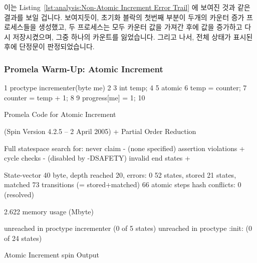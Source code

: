 이는
Listing~\ref{lst:analysis:Non-Atomic Increment Error Trail}
에 보여진 것과 같은 결과를 보일 겁니다.
보여지듯이, 초기화 블락의 첫번째 부분이 두개의 카운터 증가 프로세스들을
생성했고, 두 프로세스는 모두 카운터 값을 가져간 후에 값을 증가하고 다시
저장시켰으며, 그중 하나의 카운트를 잃었습니다.
그리고 나서, 전체 상태가 표시된 후에 단정문이 판정되었습니다.
\iffalse

This gives the output shown in
Listing~\ref{lst:analysis:Non-Atomic Increment Error Trail}.
As can be seen, the first portion of the init block created both
incrementer processes, both of which first fetched the counter,
then both incremented and stored it, losing a count.
The assertion then triggered, after which the global state is displayed.
\fi

\subsubsection{Promela Warm-Up: Atomic Increment}
\label{sec:formal:Promela Warm-Up: Atomic Increment}

\begin{listing}[htbp]
{ \scriptsize
\begin{verbbox}
  1 proctype incrementer(byte me)
  2 {
  3   int temp;
  4
  5   atomic {
  6     temp = counter;
  7     counter = temp + 1;
  8   }
  9   progress[me] = 1;
 10 }
\end{verbbox}
}
\centering
\theverbbox
\caption{Promela Code for Atomic Increment}
\label{lst:analysis:Promela Code for Atomic Increment}
\end{listing}

\begin{listing}[htbp]
{ \scriptsize
\begin{verbbox}
(Spin Version 4.2.5 -- 2 April 2005)
        + Partial Order Reduction

Full statespace search for:
        never claim             - (none specified)
        assertion violations    +
        cycle checks            - (disabled by -DSAFETY)
        invalid end states      +

State-vector 40 byte, depth reached 20, errors: 0
      52 states, stored
      21 states, matched
      73 transitions (= stored+matched)
      66 atomic steps
hash conflicts: 0 (resolved)

2.622   memory usage (Mbyte)

unreached in proctype incrementer
        (0 of 5 states)
unreached in proctype :init:
        (0 of 24 states)
\end{verbbox}
}
\centering
\theverbbox
\caption{Atomic Increment spin Output}
\label{lst:analysis:Atomic Increment spin Output}
\end{listing}

